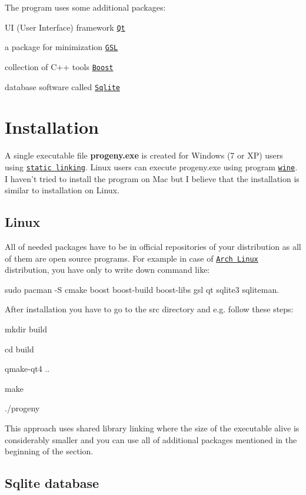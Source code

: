 The program uses some additional packages\-:
\begin{DoxyItemize}
\item U\-I (User Interface) framework \href{http://qt-project.org/}{\tt Qt}
\item a package for minimization \href{http://www.gnu.org/software/gsl/}{\tt G\-S\-L}
\item collection of {\ttfamily C++} tools \href{http://www.boost.org/}{\tt Boost}
\item database software called \href{http://www.sqlite.org}{\tt Sqlite}
\end{DoxyItemize}\hypertarget{index_Installation}{}\section{Installation}\label{index_Installation}
A single executable file {\bfseries progeny.\-exe} is created for Windows (7 or X\-P) users using \href{http://pic.dhe.ibm.com/infocenter/aix/v7r1/index.jsp?topic=%2Fcom.ibm.aix.prftungd%2Fdoc%2Fprftungd%2Fwhen_dyn_linking_static_linking.htm}{\tt static linking}. Linux users can execute {\ttfamily progeny.\-exe} using program \href{http://www.winehq.org/}{\tt wine}. I haven't tried to install the program on Mac but I believe that the installation is similar to installation on Linux. \hypertarget{index_Linux}{}\subsection{Linux}\label{index_Linux}
All of needed packages have to be in official repositories of your distribution as all of them are open source programs. For example in case of \href{https://www.archlinux.org/}{\tt Arch Linux} distribution, you have only to write down command like\-:\par
 {\ttfamily sudo pacman -\/\-S cmake boost boost-\/build boost-\/libs gsl qt sqlite3 sqliteman}.\par
 After installation you have to go to the src directory and e.\-g. follow these steps\-:\par
 {\ttfamily  mkdir build\par
 cd build\par
 qmake-\/qt4 ..\par
 make\par
 ./progeny\par
 } This approach uses shared library linking where the size of the executable {\ttfamily alive} is considerably smaller and you can use all of additional packages mentioned in the beginning of the section.\hypertarget{index_sql_win}{}\subsection{Sqlite database}\label{index_sql_win}
